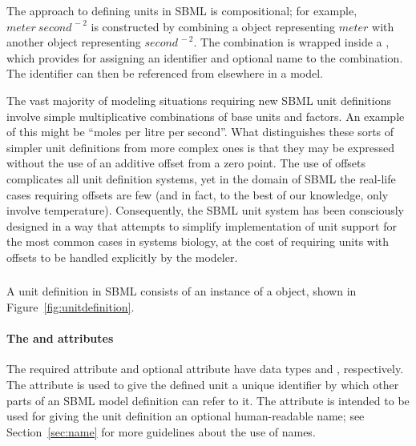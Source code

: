 The approach to defining units in SBML is compositional; for
example, $meter\ second^{\,-2}$ is constructed by combining a
\Unit object representing $meter$ with another \Unit object
representing $second^{\,-2}$.  The combination is wrapped inside a
\UnitDefinition, which provides for assigning an identifier and
optional name to the combination.  The identifier can then be
referenced from elsewhere in a model.

The vast majority of modeling situations requiring new SBML unit
definitions involve simple multiplicative combinations of base
units and factors.  An example of this might be ``moles per litre
per second''.  What distinguishes these sorts of simpler unit
definitions from more complex ones is that they may be expressed
without the use of an additive offset from a zero point.  The use
of offsets complicates all unit definition systems, yet in the
domain of SBML the real-life cases requiring offsets are few (and
in fact, to the best of our knowledge, only involve temperature).
Consequently, the SBML unit system has been consciously designed
in a way that attempts to simplify implementation of unit support
for the most common cases in systems biology, at the cost of
requiring units with offsets to be handled explicitly by the
modeler.


\subsubsection{}
\label{sec:unitdefinition-structure}

A unit definition in SBML consists of an instance of a
\UnitDefinition object, shown in Figure~\ref{fig:unitdefinition}.


\paragraph{The  and  attributes}

The required attribute  and optional attribute  have
data types  and , respectively.
The  attribute is used to give the defined unit a unique
identifier by which other parts of an SBML model definition can
refer to it.  The  attribute is intended to be used for
giving the unit definition an optional human-readable name; see
Section~\ref{sec:name} for more guidelines about the use of names.

